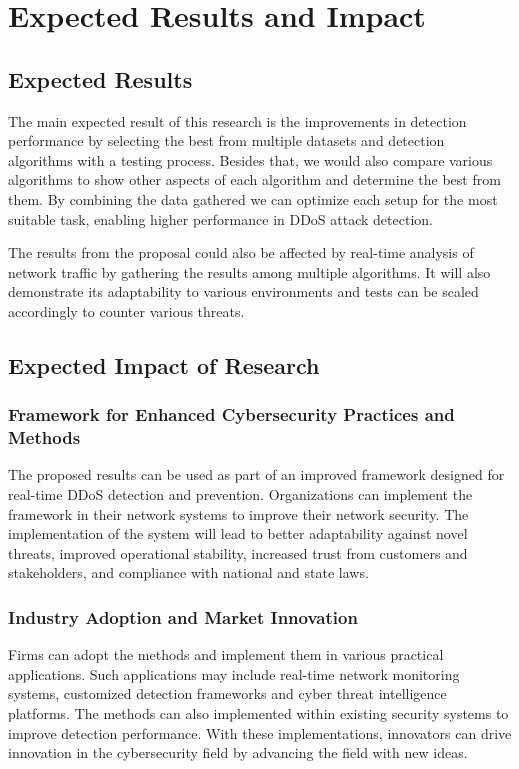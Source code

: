 \documentclass[a4paper, 12pt]{article}
\begin{document}
\clearpage

\section{Expected Results and Impact}

\subsection{Expected Results}
The main expected result of this research is the improvements in detection performance by selecting the best from multiple datasets and detection algorithms with a testing process. Besides that, we would also compare various algorithms to show other aspects of each algorithm and determine the best from them. By combining the data gathered we can optimize each setup for the most suitable task, enabling higher performance in DDoS attack detection. 

The results from the proposal could also be affected by real-time analysis of network traffic by gathering the results among multiple algorithms. It will also demonstrate its adaptability to various environments and tests can be scaled accordingly to counter various threats. 

\subsection{Expected Impact of Research}

\subsubsection{ Framework for Enhanced Cybersecurity Practices and Methods }

The proposed results can be used as part of an improved framework designed for real-time DDoS detection and prevention. Organizations can implement the framework in their network systems to improve their network security. The implementation of the system will lead to better adaptability against novel threats, improved operational stability, increased trust from customers and stakeholders, and compliance with national and state laws. 

\subsubsection{ Industry Adoption and Market Innovation }

Firms can adopt the methods and implement them in various practical applications. Such applications may include real-time network monitoring systems, customized detection frameworks and cyber threat intelligence platforms. The methods can also implemented within existing security systems to improve detection performance. With these implementations, innovators can drive innovation in the cybersecurity field by advancing the field with new ideas.
\end{document}

